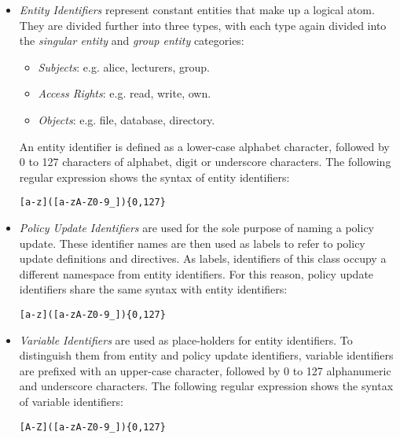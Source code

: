 \documentclass[global,twocolumn,draft]{svjour}
\newenvironment{vverbatim}
  {\begin{alltt}}
  {\vspace{-\baselineskip}\end{alltt}}
\begin{document}
          \begin{itemize}
            \item
              {\em Entity Identifiers} represent constant entities that make up
              a logical atom. They are divided further into three types, with
              each type again divided into the {\em singular entity} and
              {\em group entity} categories:

              \begin{itemize}
                \item
                  {\em Subjects}: e.g. alice, lecturers, group.
                \item
                  {\em Access Rights}: e.g. read, write, own.
                \item
                  {\em Objects}: e.g. file, database, directory.
              \end{itemize}

              An entity identifier is defined as a lower-case alphabet
              character, followed by 0 to 127 characters of alphabet, digit or
              underscore characters. The following regular expression shows the
              syntax of entity identifiers:

              \begin{vverbatim}
  [a-z]([a-zA-Z0-9\_])\{0,127\}
              \end{vverbatim}

            \item
              {\em Policy Update Identifiers} are used for the sole purpose of
              naming a policy update. These identifier names are then used as
              labels to refer to policy update definitions and directives. As
              labels, identifiers of this class occupy a different namespace
              from entity identifiers. For this reason, policy update
              identifiers share the same syntax with entity identifiers:


              \begin{vverbatim}
  [a-z]([a-zA-Z0-9\_])\{0,127\}
              \end{vverbatim}

            \item
              {\em Variable Identifiers} are used as place-holders for entity
              identifiers. To distinguish them from entity and policy update
              identifiers, variable identifiers are prefixed with an upper-case
              character, followed by 0 to 127 alphanumeric and underscore
              characters. The following regular expression shows the syntax of
              variable identifiers:

              \begin{vverbatim}
  [A-Z]([a-zA-Z0-9\_])\{0,127\}
              \end{vverbatim}
          \end{itemize}
\end{document}
